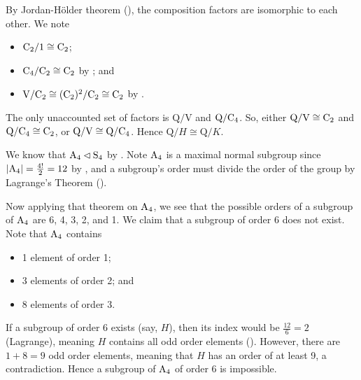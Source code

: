 \begin{questions}
\begin{partquestions}{\roman*}
        \item By Jordan-H\"older theorem (), the composition factors are isomorphic to each other. We note
        \begin{itemize}
            \item $\mathrm{C}_{2} / 1 \cong \mathrm{C}_{2}$;
            \item $\mathrm{C}_{4} / \mathrm{C}_{2} \cong \mathrm{C}_{2}$ by ; and
            \item $\mathrm{V} / \mathrm{C}_{2} \cong (\mathrm{C}_{2})^2 / \mathrm{C}_{2} \cong \mathrm{C}_{2}$ by .
        \end{itemize}
        The only unaccounted set of factors is $\mathrm{Q}/\mathrm{V}$ and $\mathrm{Q}/\mathrm{C}_{4}$. So, either $\mathrm{Q}/\mathrm{V} \cong \mathrm{C}_{2}$ and $\mathrm{Q}/\mathrm{C}_{4} \cong \mathrm{C}_{2}$, or $\mathrm{Q}/\mathrm{V} \cong \mathrm{Q}/\mathrm{C}_{4}$. Hence $\mathrm{Q}/H \cong \mathrm{Q}/K$.
    \end{partquestions}

    \item We know that $\mathrm{A}_{4} \lhd \mathrm{S}_{4}$ by . Note $\mathrm{A}_{4}$ is a maximal normal subgroup since $|\mathrm{A}_{4}| = \frac{4!}2 = 12$ by , and a subgroup's order must divide the order of the group by Lagrange's Theorem ().

    Now applying that theorem on $\mathrm{A}_{4}$, we see that the possible orders of a subgroup of $\mathrm{A}_{4}$ are 6, 4, 3, 2, and 1. We claim that a subgroup of order 6 does not exist. Note that $\mathrm{A}_{4}$ contains
    \begin{itemize}
        \item 1 element of order 1;
        \item 3 elements of order 2; and
        \item 8 elements of order 3.
    \end{itemize}
    If a subgroup of order 6 exists (say, $H$), then its index would be $\frac{12}{6} = 2$ (Lagrange), meaning $H$ contains all odd order elements (). However, there are $1 + 8 = 9$ odd order elements, meaning that $H$ has an order of at least 9, a contradiction. Hence a subgroup of $\mathrm{A}_{4}$ of order 6 is impossible.


\end{questions}
